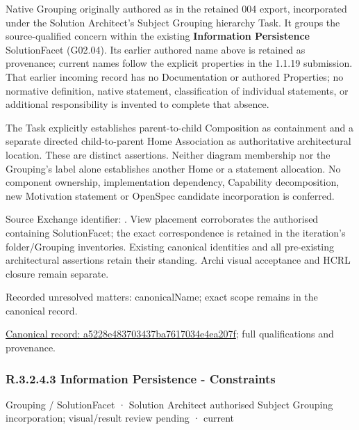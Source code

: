 Native Grouping originally authored as \texttt{} in the retained 004 export,
incorporated under the Solution Architect's Subject Grouping hierarchy Task.
It groups the source-qualified \texttt{} concern within
the existing \textbf{Information Persistence} SolutionFacet (G02.04). Its earlier authored name above is retained as provenance; current names
follow the explicit properties in the 1.1.19 submission.
That earlier incoming record has no Documentation or authored Properties; no normative
definition, native statement, classification of individual statements, or
additional responsibility is invented to complete that absence.



The Task explicitly establishes parent-to-child Composition as containment and
a separate directed child-to-parent Home Association as authoritative architectural
location. These are distinct assertions. Neither diagram membership nor the
Grouping's label alone establishes another Home or a statement allocation.
No component ownership, implementation dependency, Capability decomposition,
new Motivation statement or OpenSpec candidate incorporation is conferred.



Source Exchange identifier: \texttt{}. View placement corroborates
the authorised containing SolutionFacet; the exact correspondence is retained in the
iteration's folder/Grouping inventories. Existing canonical identities and all
pre-existing architectural assertions retain their standing. Archi visual
acceptance and HCRL closure remain separate.


{\small Recorded unresolved matters: canonicalName; exact scope remains in the canonical record.}\par
{\footnotesize \href{../../../../../../../continuum/grouping/a5228e483703437ba7617034e4ea207f.md}{Canonical record: a5228e483703437ba7617034e4ea207f}; full qualifications and provenance.}\par
\subsubsection*{R.3.2.4.3 Information Persistence - Constraints}
\label{navigation:R.3.2.4.3}

\label{element:76b2a8e5551e4645a048f48e4820a0bc}
{\small Grouping / SolutionFacet · Solution Architect authorised Subject Grouping incorporation; visual/result review pending · current}\par

